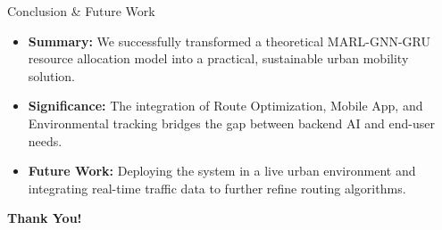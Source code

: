 \documentclass{beamer}
\begin{document}
\begin{frame}{Conclusion \& Future Work}
  \begin{itemize}
      \item \textbf{Summary:} We successfully transformed a theoretical MARL-GNN-GRU resource allocation model into a practical, sustainable urban mobility solution.
      \item \textbf{Significance:} The integration of Route Optimization, Mobile App, and Environmental tracking bridges the gap between backend AI and end-user needs.
      \item \textbf{Future Work:} Deploying the system in a live urban environment and integrating real-time traffic data to further refine routing algorithms.
  \end{itemize}
  \vspace{1cm}
  \begin{center}
      \textbf{Thank You!}
  \end{center}
\end{frame}
\end{document}
